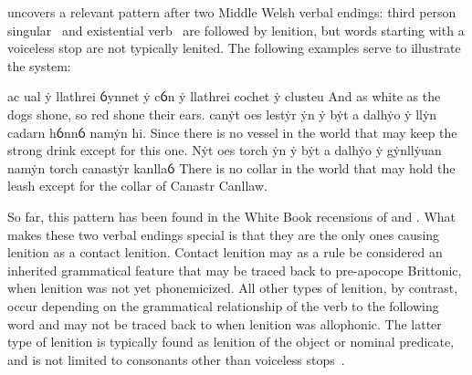 \Textcite{van_development14} uncovers a relevant pattern after two Middle Welsh verbal endings: third person singular \ei\ and existential verb \oes\ are followed by lenition, but words starting with a voiceless stop are not typically lenited. The following examples serve to illustrate the system:
\begin{mwl}
  {ac ual ẏ llathrei ỽynnet ẏ cỽn ẏ llathrei cochet ẏ clusteu}%
  {And as white as the dogs shone, so red shone their ears.}%
  {canẏt oes lestẏr ẏn ẏ bẏt a dalhẏo ẏ llẏn cadarn hỽnnỽ namẏn hi.}%
  {Since there is no vessel in the world that may keep the strong drink except for this one.}%
  {Nẏt oes torch ẏn ẏ bẏt a dalhẏo ẏ gẏnllẏuan namẏn torch canastẏr kanllaỽ}%
  {There is no collar in the world that may hold the leash except for the collar of Canastr Canllaw.}%
\end{mwl}
So far, this pattern has been found in the White Book recensions of  and . 
What makes these two verbal endings special is that they are the only ones causing lenition as a contact lenition. Contact lenition may as a rule be considered an inherited grammatical feature that may be traced back to pre-apocope Brittonic, when lenition was not yet phonemicized. All other types of lenition, by contrast, occur depending on the grammatical relationship of the verb to the following word and may not be traced back to when lenition was allophonic. The latter type of lenition is typically found as lenition of the object or nominal predicate, and is not limited to consonants other than voiceless stops~\autocite[70]{van_development14}.

